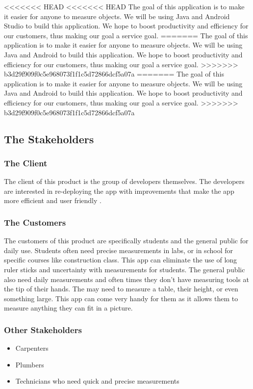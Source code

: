 \documentclass[12pt, titlepage]{article}
\begin{document}
<<<<<<< HEAD
<<<<<<< HEAD
\noindent The goal of this application is to make it easier for anyone to measure objects. We will be using Java and Android  Studio to build this application. We hope to boost productivity and efficiency for our customers, thus making our goal a service goal.
=======
\noindent The goal of this application is to make it easier for anyone to measure objects. We will be using Java and Android to build this application. We hope to boost productivity and efficiency for our customers, thus making our goal a service goal.
>>>>>>> b3d29f909f0c5e968073f1f1c5d72866dcf5a07a
=======
\noindent The goal of this application is to make it easier for anyone to measure objects. We will be using Java and Android to build this application. We hope to boost productivity and efficiency for our customers, thus making our goal a service goal.
>>>>>>> b3d29f909f0c5e968073f1f1c5d72866dcf5a07a

\subsection{The Stakeholders}

\subsubsection{The Client}
The client of this product is the group of developers themselves. The developers are interested in re-deploying the app with improvements that make the app more efficient and user friendly .

\subsubsection{The Customers}
The customers of this product are specifically students and the general public for daily use. Students often need precise measurements in labs, or in school for specific courses like construction class. This app can eliminate the use of long ruler sticks and uncertainty with measurements for students. The general public also need daily measurements and often times they don’t have measuring tools at the tip of their hands. The may need to measure a table, their height, or even something large. This app can come very handy for them as it allows them to measure anything they can fit in a picture. 

\subsubsection{Other Stakeholders}
\begin{itemize}
    \item Carpenters
    \item Plumbers
    \item Technicians who need quick and precise measurements
\end{itemize}
\end{document}
